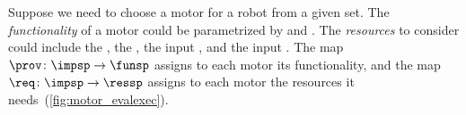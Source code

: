\begin{example}
    \begin{comment}

        \begin{table}[tbh]
            \begin{center}
                \begin{tabular}{cccc}
                    Technology & Specific energy [\unitfrac[]{J}{kg}] & Specific cost [\unitfrac[]{J}{\stdcurr}]
                    & Life [\# cycles]
                    \\
                    \hline
                    $\mathsf{NiMH}$  & 100.0 & 3.41 & 500    \\
                    $\mathsf{NiH2}$  & 45.0  & 10.5 & 20,000 \\
                    $\mathsf{LCO}$   & 195.0 & 2.84 & 750    \\
                    $\mathsf{LMO}$   & 150.0 & 2.84 & 500    \\
                    $\mathsf{NiCad}$ & 30.0  & 7.50 & 500    \\
                    $\mathsf{SLA}$   & 30.0  & 7.00 & 500    \\
                    $\mathsf{LiPo}$  & 250.0 & 2.50 & 600    \\
                    $\mathsf{LFP}$   & 90.0  & 1.50 & 1,500
                \end{tabular}
            \end{center}
            \caption{Specifications of common battery technologies~\cite{censi2015}. }
            \label{tab:battery}
        \end{table}
    \end{comment}

\end{example}


\begin{example}
    \label{exa:motor}
    Suppose we need to choose a motor for a robot from
    a given set. The \emph{functionality} of a motor could be parametrized
    by  and . The \emph{resources} to consider
    could include the \R{\unit[cost]{[USD]}}, the \R{\unit[mass]{[g]}}, the
    input \R{\unit[voltage]{[V]}}, and the input \R{\unit[current]{[A]}}.
    The map~$\prov \colon \impsp\to\funsp$ assigns to each motor its
    functionality, and the map~$\req \colon \impsp\rightarrow\ressp$ assigns
    to each motor the resources it needs~(\cref{fig:motor_evalexec}).
\end{example}

